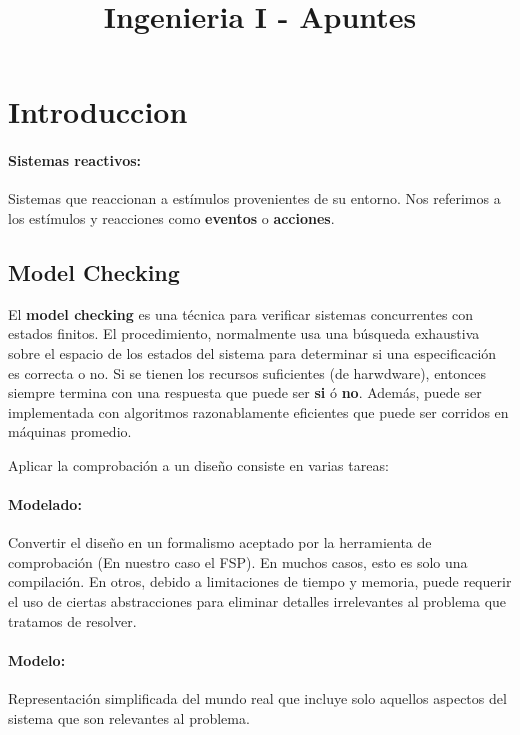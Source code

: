 






\title{Ingenieria I - Apuntes}


	
\maketitle
\tableofcontents
\newpage
\section{Introduccion}
\paragraph{Sistemas reactivos:} Sistemas que reaccionan a estímulos provenientes de su entorno. Nos referimos a los estímulos y reacciones como \textbf{eventos} o \textbf{acciones}.


\subsection{Model Checking}
El \textbf{model checking} es una técnica para verificar sistemas concurrentes con estados finitos. El procedimiento, normalmente usa una búsqueda exhaustiva sobre el espacio de los estados del sistema para determinar si una especificación es correcta o no. Si se tienen los recursos suficientes (de harwdware), entonces siempre termina con una respuesta que puede ser \textbf{si} ó \textbf{no}. Además, puede ser implementada con algoritmos razonablamente eficientes que puede ser corridos en máquinas promedio. 

Aplicar la comprobación a un diseño consiste en varias tareas:

\paragraph{Modelado:} Convertir el diseño en un formalismo aceptado por la herramienta de comprobación (En nuestro caso el FSP). En muchos casos, esto es solo una compilación. En otros, debido a limitaciones de tiempo y memoria, puede requerir el uso de ciertas abstracciones para eliminar detalles irrelevantes al problema que tratamos de resolver.


\paragraph{Modelo:} Representación simplificada del mundo real que incluye solo aquellos aspectos del sistema que son relevantes al problema.

